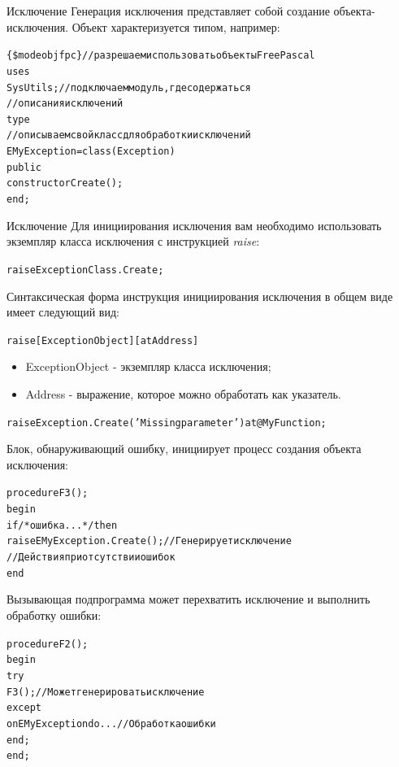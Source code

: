 \documentclass{beamer}
\begin{document}
\begin{frame}[fragile]{Исключение}
Генерация исключения представляет собой создание объекта-исключения. Объект характеризуется типом, например:
\begin{alltt}
\{\$mode objfpc\} //разрешаем использовать объекты Free Pascal
uses
  SysUtils;		  //подключаем модуль, где содержаться 
                  // описания исключений
type
  //описываем свой класс для обработки исключений
  EMyException = class(Exception)
    public
      constructor Create();
  end;
\end{alltt}
\end{frame}

\begin{frame}[fragile]{Исключение}
Для инициирования исключения вам необходимо использовать экземпляр класса исключения с инструкцией \textit{raise}:
\begin{alltt}
raise ExceptionClass.Create;
\end{alltt}
Синтаксическая форма инструкция инициирования исключения в общем виде имеет следующий вид:
\begin{alltt}
raise [ExceptionObject] [at Address]
\end{alltt}
\begin{itemize}
\item ExceptionObject - экземпляр класса исключения;
\item Address - выражение, которое можно обработать как указатель.
\end{itemize}
\begin{alltt}
raise Exception.Create('Missing parameter') at @MyFunction;
\end{alltt}
\end{frame}

\begin{frame}[fragile]
Блок, обнаруживающий ошибку, инициирует процесс создания объекта исключения:
\begin{alltt}
procedure F3();
begin
  if /* ошибка... */ then
    raise EMyException.Create(); // Генерирует исключение
  // Действия при отсутствии ошибок
end
\end{alltt}
Вызывающая подпрограмма может перехватить исключение и выполнить обработку ошибки:
\begin{alltt}
procedure F2();
begin
  try 
    F3(); // Может генерировать исключение
  except
    on EMyException do ...    // Обработка ошибки
  end;
end;
\end{alltt}
\end{frame}
\end{document}
